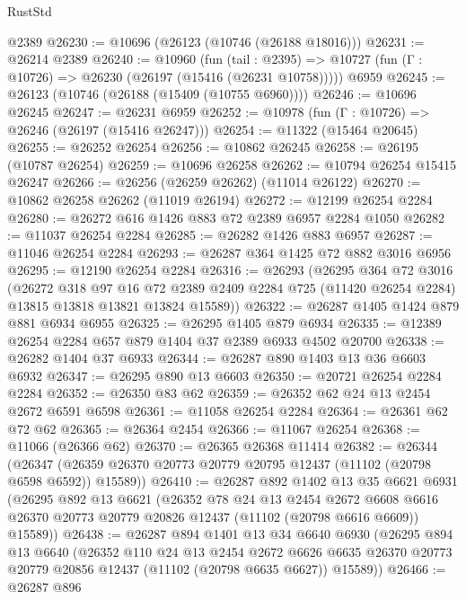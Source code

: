 \begin{lexlean}{RustStd}
\begin{coremodule}
    @2389
@26230 := @10696 (@26123 (@10746 (@26188 @18016)))
@26231 := @26214 @2389
@26240 := @10960
    (fun (tail : @2395) => @10727 (fun (Γ : @10726) => @26230 (@26197 (@15416 (@26231 @10758)))))
    @6959
@26245 := @26123 (@10746 (@26188 (@15409 (@10755 @6960))))
@26246 := @10696 @26245
@26247 := @26231 @6959
@26252 := @10978 (fun (Γ : @10726) => @26246 (@26197 (@15416 @26247)))
@26254 := @11322 (@15464 @20645)
@26255 := @26252 @26254
@26256 := @10862 @26245
@26258 := @26195 (@10787 @26254)
@26259 := @10696 @26258
@26262 := @10794 @26254 @15415 @26247
@26266 := @26256 (@26259 @26262) (@11014 @26122)
@26270 := @10862 @26258 @26262 (@11019 @26194)
@26272 := @12199 @26254 @2284
@26280 := @26272 @616 @1426 @883 @72 @2389 @6957 @2284 @1050
@26282 := @11037 @26254 @2284
@26285 := @26282 @1426 @883 @6957
@26287 := @11046 @26254 @2284
@26293 := @26287 @364 @1425 @72 @882 @3016 @6956
@26295 := @12190 @26254 @2284
@26316 := @26293
    (@26295
      @364
      @72
      @3016
      (@26272
        @318
        @97
        @16
        @72
        @2389
        @2409
        @2284
        @725
        (@11420 @26254 @2284)
        @13815
        @13818
        @13821
        @13824
        @15589))
@26322 := @26287 @1405 @1424 @879 @881 @6934 @6955
@26325 := @26295 @1405 @879 @6934
@26335 := @12389 @26254 @2284 @657 @879 @1404 @37 @2389 @6933 @4502 @20700
@26338 := @26282 @1404 @37 @6933
@26344 := @26287 @890 @1403 @13 @36 @6603 @6932
@26347 := @26295 @890 @13 @6603
@26350 := @20721 @26254 @2284 @2284
@26352 := @26350 @83 @62
@26359 := @26352 @62 @24 @13 @2454 @2672 @6591 @6598
@26361 := @11058 @26254 @2284
@26364 := @26361 @62 @72 @62
@26365 := @26364 @2454
@26366 := @11067 @26254
@26368 := @11066 (@26366 @62)
@26370 := @26365 @26368 @11414
@26382 := @26344
    (@26347 (@26359 @26370 @20773 @20779 @20795 @12437 (@11102 (@20798 @6598 @6592)) @15589))
@26410 := @26287
    @892
    @1402
    @13
    @35
    @6621
    @6931
    (@26295
      @892
      @13
      @6621
      (@26352
        @78
        @24
        @13
        @2454
        @2672
        @6608
        @6616
        @26370
        @20773
        @20779
        @20826
        @12437
        (@11102 (@20798 @6616 @6609))
        @15589))
@26438 := @26287
    @894
    @1401
    @13
    @34
    @6640
    @6930
    (@26295
      @894
      @13
      @6640
      (@26352
        @110
        @24
        @13
        @2454
        @2672
        @6626
        @6635
        @26370
        @20773
        @20779
        @20856
        @12437
        (@11102 (@20798 @6635 @6627))
        @15589))
@26466 := @26287
    @896

\end{coremodule}
\end{lexlean}
